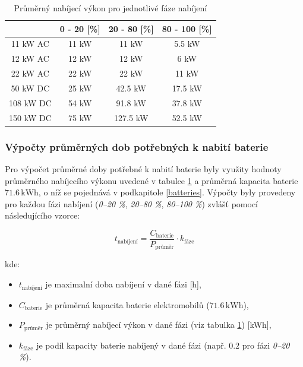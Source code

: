 \documentclass[a4paper,11pt]{article}
\begin{document}
\begin{table}[H]
    \centering 
    \vspace{0.5cm} %
    \begin{tabular}{|c|c|c|c|}
        \hline
        \textbf{} & \textbf{0 - 20 [\%]} & \textbf{20 - 80 [\%]} & \textbf{80 - 100 [\%]}\\
        \hline
        11 kW AC  &  11 kW  & 11 kW & 5.5 kW     \\
        \hline
        12 kW AC  &  12 kW  & 12 kW & 6 kW     \\
        \hline
        22 kW AC  &  22 kW  & 22 kW & 11 kW  \\
        \hline
        50 kW DC  &  25 kW  & 42.5 kW & 17.5 kW    \\
        \hline
        108 kW DC &  54 kW  & 91.8 kW & 37.8 kW \\
        \hline
        150 kW DC &  75 kW  & 127.5 kW & 52.5 kW \\
        \hline
    \end{tabular}
    \caption{Průměrný nabíjecí výkon pro jednotlivé fáze nabíjení}
    \label{table:average-charging-power}
    \vspace{0.5cm} %
\end{table}


\subsubsection{Výpočty průměrných dob potřebných k nabití baterie}

Pro výpočet průměrné doby potřebné k nabití baterie byly využity hodnoty průměrného nabíjecího výkonu uvedené v tabulce \ref{table:average-charging-power} a průměrná kapacita baterie \(71.6 \, \mathrm{kWh}\), o níž se pojednává v podkapitole \ref{batteries}. Výpočty byly provedeny pro každou fázi nabíjení (\textit{0–20 \%}, \textit{20–80 \%}, \textit{80–100 \%}) zvlášť pomocí následujícího vzorce:

\[
t_{\text{nabíjení}} = \frac{C_{\text{baterie}}}{P_{\text{průměr}}} \cdot k_{\text{fáze}}
\]

kde:
\begin{itemize}
    \item \(t_{\text{nabíjení}}\) je maximalní doba nabíjení v dané fázi [h],
    \item \(C_{\text{baterie}}\) je průměrná kapacita baterie elektromobilů (\(71.6 \, \mathrm{kWh}\)),
    \item \(P_{\text{průměr}}\) je průměrný nabíjecí výkon v dané fázi (viz tabulka \ref{table:average-charging-power}) [kWh],
    \item \(k_{\text{fáze}}\) je podíl kapacity baterie nabíjený v dané fázi (např. \(0.2\) pro fázi \textit{0–20 \%}).\\
\end{itemize}
\end{document}
